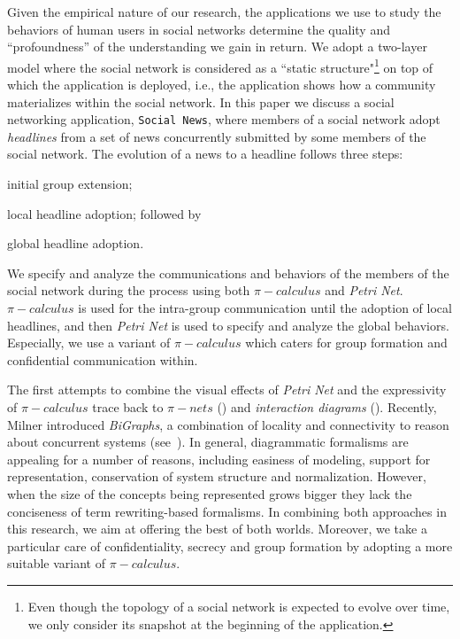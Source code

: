 Given the empirical nature of our research, the applications we use to study the behaviors of human users in social
networks determine the quality and ``profoundness'' of the understanding we gain in return. We adopt a two-layer model
where the social network is considered as a ``static structure"\footnote{Even though the topology of a social network is
expected to evolve over time, we only consider its snapshot at the beginning of the application.} on top of which the
application is deployed, i.e., the application shows how a community materializes within the social network. In this
paper we discuss a social networking application, {\tt Social News}, where members of a social network adopt
\emph{headlines} from a set of news concurrently submitted by some members of the social network. The evolution of a news
to a headline follows three steps: \begin{inparaenum}[\itshape 1\upshape)] \item initial group extension; \item local
headline adoption; followed by \item global headline adoption. \end{inparaenum} We specify and analyze the communications
and behaviors of the members of the social network during the process using both $\pi-calculus$ and \emph{Petri Net}.
$\pi-calculus$ is used for the intra-group communication until the adoption of local headlines, and then \emph{Petri Net}
is used to specify and analyze the global behaviors. Especially, we use a variant of $\pi-calculus$ which caters for
group formation and confidential communication within.

The first attempts to combine the visual effects of \emph{Petri Net} and the expressivity of $\pi-calculus$ trace back to
$\pi-nets$ (\cite{Milner:94}) and \emph{interaction diagrams} (\cite{Parrow:95}). Recently, Milner introduced
\emph{BiGraphs}, a combination of locality and connectivity to reason about concurrent systems
(see~\cite{Milner:08,Milner:09}). In general, diagrammatic formalisms are appealing for a number of reasons, including
easiness of modeling, support for representation, conservation of system structure and normalization. However, when the
size of the concepts being represented grows bigger they lack the conciseness of term rewriting-based formalisms. In
combining both approaches in this research, we aim at offering the best of both worlds. Moreover, we take a particular
care of confidentiality, secrecy and group formation by adopting a more suitable variant of $\pi-calculus$.

